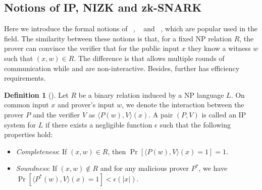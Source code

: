 \documentclass[letterpaper,twocolumn,10pt]{article}
\theoremstyle{definition}
\newtheorem{definition}{Definition}[section]
\newcommand{\zk}{\text{zk-SNARK}\xspace}
\newcommand{\IP}{\text{IP}\xspace}
\newcommand{\new}[1]{{#1}\xspace}
\newcommand{\ZKP}{\text{ZKP}\xspace}
\newcommand{\NIZK}{\text{NIZK}\xspace}
\begin{document}
\subsection{Notions of IP, NIZK and zk-SNARK}
\label{sec-notion}
\new{Here we introduce the formal notions of \IP~\cite{goldwasser2019knowledge}, \NIZK~\cite{groth2010short} and \zk~\cite{gennaro2013quadratic}, which are popular used in the \ZKP field.
	The similarity between these notions is that, for a fixed NP relation $R$, the prover can convince the verifier that for the public input $x$ they know a witness $w$ such that $(x,w)\in R$. The difference is that \IP allows multiple rounds of communication while \NIZK and \zk are non-interactive. Besides, \zk further has efficiency requirements.}
\new{\begin{definition}[\IP]
		Let $R$ be a binary relation induced by a NP language $L$.
		On common input $x$ and prover's input $w$, we denote the interaction between the prover $P$ and the verifier $V$ as $\langle P(w), V\rangle(x)$. A pair $(P,V)$ is called an IP system for $L$ if there exists a negligible function $\epsilon$ such that the following properties hold:
		\begin{itemize}[noitemsep, topsep=2pt, partopsep=0pt,leftmargin=0.4cm]
			\item \textit{Completeness}: If $(x,w)\in R$, then $\Pr[\langle P(w),V\rangle(x)=1]=1$.
			\item \textit{Soundness}: If $(x,w)\notin R$ and for any malicious prover $P^{*}$, we have $\Pr[\langle P^{*}(w),V\rangle(x)=1]<\epsilon(|x|)$. 
		\end{itemize}
\end{definition}}
\end{document}
